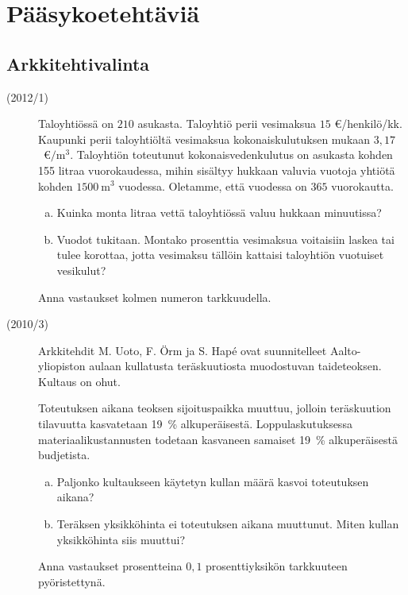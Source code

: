 \section{Pääsykoetehtäviä}

\subsection{Arkkitehtivalinta}

\begin{description}
    \item[(2012/1)] Taloyhtiössä on $210$ asukasta. Taloyhtiö perii vesimaksua
        $15$ \euro/henkilö/kk. Kaupunki perii taloyhtiöltä vesimaksua
        kokonaiskulutuksen mukaan $3,17$~\euro $/ \mathrm{m}^3$.
        Taloyhtiön toteutunut kokonaisvedenkulutus on asukasta kohden
        155 litraa vuorokaudessa, mihin sisältyy hukkaan valuvia
        vuotoja yhtiötä kohden $1500~\mathrm{m}^3$ vuodessa. Oletamme,
        että vuodessa on $365$ vuorokautta.
                    
    \begin{enumerate}[(a)]
        \item Kuinka monta litraa vettä taloyhtiössä valuu hukkaan minuutissa?
        \item Vuodot tukitaan. Montako prosenttia vesimaksua voitaisiin laskea
            tai tulee korottaa, jotta vesimaksu tällöin kattaisi taloyhtiön
            vuotuiset vesikulut?
    \end{enumerate}
    
    Anna vastaukset kolmen numeron tarkkuudella.
\end{description}


\begin{description}
    \item[(2010/3)] Arkkitehdit M. Uoto, F. Örm ja S. Hapé ovat suunnitelleet Aalto-yliopiston aulaan kullatusta teräskuutiosta muodostuvan taideteoksen. Kultaus on ohut.
    
    Toteutuksen aikana teoksen sijoituspaikka muuttuu, jolloin teräskuution tilavuutta kasvatetaan 19~\% alkuperäisestä. Loppulaskutuksessa materiaalikustannusten todetaan kasvaneen samaiset 19~\% alkuperäisestä budjetista.                   
    \begin{enumerate}[(a)]
        \item Paljonko kultaukseen käytetyn kullan määrä kasvoi toteutuksen aikana?
        \item Teräksen yksikköhinta ei toteutuksen aikana muuttunut. Miten kullan yksikköhinta siis muuttui?
    \end{enumerate}
    
    Anna vastaukset prosentteina $0,1$ prosenttiyksikön tarkkuuteen pyöristettynä.
\end{description}

